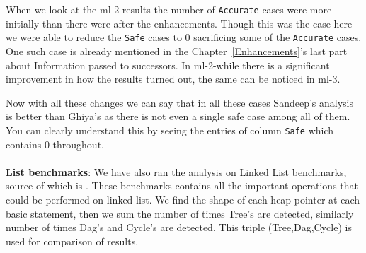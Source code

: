 When we look at the ml-2 results the number of {\tt Accurate} cases were more initially than there were after the enhancements. Though this was the case here we were able to
reduce the {\tt Safe} cases to 0 sacrificing some of the {\tt Accurate} cases. One such case is already mentioned in the Chapter~\ref{Enhancements}'s last part
about Information passed to successors. In ml-2-while there is a significant improvement in how the results turned out, the same can be noticed in ml-3. 

Now with all these changes we can say that in all these cases Sandeep's analysis is better than Ghiya's as there is not even a single safe case among all
of them. You can clearly understand this by seeing the entries of column {\tt Safe} which contains 0 throughout. \\ \\
\textbf{ List benchmarks}: We have also ran the analysis on Linked List benchmarks, source of which is \cite{linkedlist}. These benchmarks contains all the 
important operations that could be performed on linked list. 
We find the shape of each heap pointer at each basic statement, then we sum the number of times Tree's are detected, similarly number of times Dag's and Cycle's are
detected. This triple (Tree,Dag,Cycle) is used for comparison of results.

  
  
